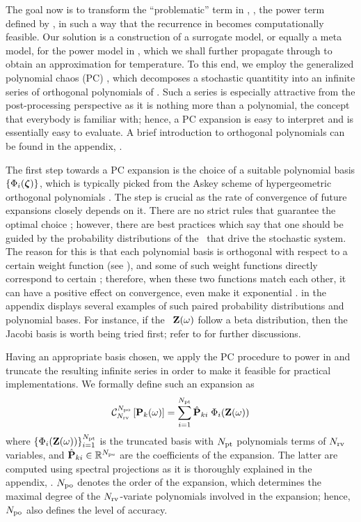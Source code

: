 The goal now is to transform the ``problematic'' term in , \ie, the power term defined by , in such a way that the recurrence in  becomes computationally feasible. Our solution is a construction of a surrogate model, or equally a meta model, for the power model in , which we shall further propagate through  to obtain an approximation for temperature. To this end, we employ the generalized polynomial chaos (PC) \cite{xiu2002}, which decomposes a stochastic quantitity into an infinite series of orthogonal polynomials of \rvs. Such a series is especially attractive from the post-processing perspective as it is nothing more than a polynomial, the concept that everybody is familiar with; hence, a PC expansion is easy to interpret and is essentially easy to evaluate. A brief introduction to orthogonal polynomials can be found in the appendix, .

The first step towards a PC expansion is the choice of a suitable polynomial basis $\{ \Phi_i(\boldsymbol{\zeta}) \}$, which is typically picked from the Askey scheme of hypergeometric orthogonal polynomials \cite{xiu2002}. The step is crucial as the rate of convergence of future expansions closely depends on it. There are no strict rules that guarantee the optimal choice \cite{maitre2010, knio2006}; however, there are best practices which say that one should be guided by the probability distributions of the \rvs\ that drive the stochastic system. The reason for this is that each polynomial basis is orthogonal with respect to a certain weight function (see ), and some of such weight functions directly correspond to certain \pdfs; therefore, when these two functions match each other, it can have a positive effect on convergence, even make it exponential \cite{xiu2002}.  in the appendix displays several examples of such paired probability distributions and polynomial bases. For instance, if the \rvs\ $\mathbf{Z}(\omega)$ follow a beta distribution, then the Jacobi basis is worth being tried first; refer to \cite{xiu2010, xiu2002} for further discussions.

Having an appropriate basis chosen, we apply the PC procedure to power in  and truncate the resulting infinite series in order to make it feasible for practical implementations. We formally define such an expansion as
\begin{equation} \elabel{pc-expansion}
  \oPC{\vars}{\pcorder}{\vP_k(\o)} = \sum_{i = 1}^{\pcterms} \pcc{\vP}_{ki} \; \pcb_i(\vZ(\o))
\end{equation}
where $\{ \Phi_i(\mathbf{Z}(\omega)) \}_{i = 1}^{{N_\text{pt}}}$ is the truncated basis with ${N_\text{pt}}$ polynomials terms of ${N_\text{rv}}$ variables, and $\hat{\mathbf{P}}_{ki} \in \mathbb{R}^{N_\text{pe}}$ are the coefficients of the expansion. The latter are computed using spectral projections as it is thoroughly explained in the appendix, . ${N_\text{po}}$ denotes the order of the expansion, which determines the maximal degree of the ${N_\text{rv}}$-variate polynomials involved in the expansion; hence, ${N_\text{po}}$ also defines the level of accuracy.

